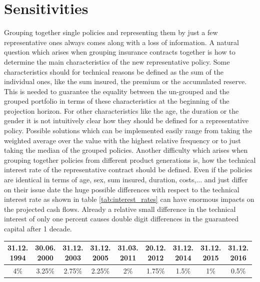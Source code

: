 

\chapter{Sensitivities}
\label{cha:sensitivities}

Grouping together single policies and representing them by just a few representative ones always comes along with a loss of information. A natural question which arises when grouping insurance contracts together is how to determine the main characteristics of the new representative policy. Some characteristics should for technical reasons be defined as the sum of the individual ones, like the sum insured, the premium or the accumulated reserve. This is needed to guarantee the equality between the un-grouped and the grouped portfolio in terms of these characteristics at the beginning of the projection horizon. For other characteristics like the age, the duration or the gender it is not intuitively clear how they should be defined for a representative policy. Possible solutions which can be implemented easily range from taking the weighted average over the value with the highest relative frequency or to just taking the median of the grouped policies. Another difficulty which arises when grouping together policies from different product generations is, how the technical interest rate of the representative contract should be defined. Even if the policies are identical in terms of age, sex, sum insured, duration, costs,... and just differ on their issue date the huge possible differences with respect to the technical interest rate as shown in table \ref{tab:interest_rates} can have enormous impacts on the projected cash flows. 
Already a relative small difference in the technical interest of only one percent causes double digit differences in the guaranteed capital after 1 decade. 

\begin{minipage}{\linewidth}
	\centering
	\begin{tabular}{*{9}{c}}
	\toprule
	\makecell{31.12.\\1994} & \makecell{30.06.\\2000} & \makecell{31.12.\\2003} & \makecell{31.12.\\2005} & 				\makecell{31.03.\\2011}  & \makecell{20.12.\\2012} & \makecell{31.12.\\2014} & \makecell{31.12.\\2015} & 				\makecell{31.12.\\2016}\\
	\midrule
	4\% & 3.25\% & 2.75\% & 2.25\% & 2\% & 1.75\% & 1.5\% & 1\% & 0.5\% \\
	\bottomrule
	\end{tabular}
	\label{tab:interest_rates}
\end{minipage}

